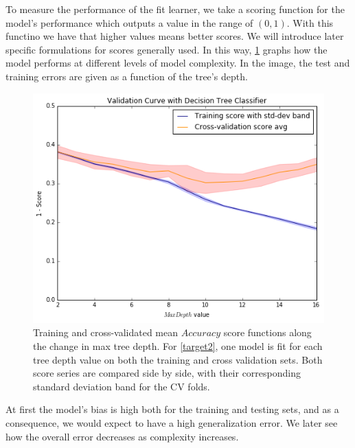 To measure the performance of the fit learner, we take a scoring function for the model's performance which outputs a value in the range of $(0,1)$. With this functino we have that higher values means better scores.
We will introduce later specific formulations for scores generally used.
In this way, \cref{figure:dtree_overfit_problem_2} graphs how the model performs at different levels of model complexity.
In the image, the test and training errors are given as a function of the tree's depth.


\begin{figure}[h!]
\begin{center}
\includegraphics[width=1\columnwidth]{figures/figure-biasVariance/dtree_overfit_problem_2.png}
\caption{ Training and cross-validated mean $Accuracy$ score functions along the change in max tree depth.
For \cref{target2}, one model is fit for each tree depth value on both the training and cross validation sets.
Both score series are compared side by side, with their corresponding standard deviation band for the CV folds.}
\label{figure:dtree_overfit_problem_2}
\end{center}
\end{figure}


At first the model's bias is high both for the training and testing sets, and as a consequence, we would expect to have a high generalization error.
We later see how the overall error decreases as complexity increases.

